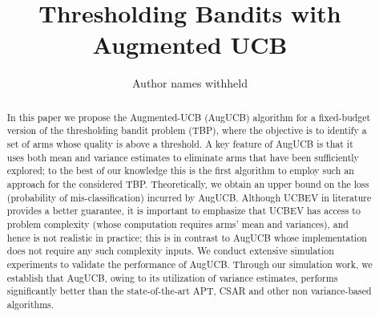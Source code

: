 \documentclass{article}
\title{Thresholding Bandits with Augmented UCB}
\author{Author names withheld}
\begin{document}
\maketitle

\begin{abstract}
In this paper we propose the Augmented-UCB (AugUCB) algorithm for a fixed-budget version of the thresholding bandit problem (TBP), where the objective is to identify a set of arms whose quality is above a threshold. A key feature of AugUCB is that it uses both mean and variance estimates to eliminate arms that have been sufficiently explored; to the best of our knowledge this is the first algorithm to employ such an approach for the considered TBP.  Theoretically, we obtain an upper bound on the loss (probability of mis-classification) incurred by AugUCB. Although UCBEV in literature provides a better guarantee, it is important to emphasize that UCBEV has access to problem complexity (whose computation requires arms' mean and variances), and hence is not realistic in practice; this is in contrast to AugUCB whose implementation does not require any such complexity inputs. We conduct extensive simulation experiments to validate the performance of AugUCB. Through our simulation work, we establish that AugUCB, owing to its utilization of variance estimates, performs significantly better than the state-of-the-art APT, CSAR and other non variance-based algorithms.






\end{abstract}
\end{document}
